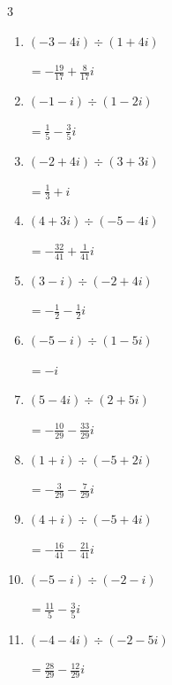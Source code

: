 \begin{multicols}{3}
\begin{enumerate}
        $\displaystyle =-\frac{24}{29}+\frac{2}{29}i$

\columnbreak %

\resetques

  \item $\displaystyle (-3-4i)\div(1+4i)$

        $\displaystyle =-\frac{19}{17}+\frac{8}{17}i$

  \item $\displaystyle (-1-i)\div(1-2i)$

        $\displaystyle =\frac{1}{5}-\frac{3}{5}i$

  \item $\displaystyle (-2+4i)\div(3+3i)$

        $\displaystyle =\frac{1}{3}+i$

  \item $\displaystyle (4+3i)\div(-5-4i)$

        $\displaystyle =-\frac{32}{41}+\frac{1}{41}i$

  \item $\displaystyle (3-i)\div(-2+4i)$

        $\displaystyle =-\frac{1}{2}-\frac{1}{2}i$

  \item $\displaystyle (-5-i)\div(1-5i)$

        $\displaystyle =-i$

  \item $\displaystyle (5-4i)\div(2+5i)$

        $\displaystyle =-\frac{10}{29}-\frac{33}{29}i$

  \item $\displaystyle (1+i)\div(-5+2i)$

        $\displaystyle =-\frac{3}{29}-\frac{7}{29}i$

  \item $\displaystyle (4+i)\div(-5+4i)$

        $\displaystyle =-\frac{16}{41}-\frac{21}{41}i$

  \item $\displaystyle (-5-i)\div(-2-i)$

        $\displaystyle =\frac{11}{5}-\frac{3}{5}i$

\columnbreak %

  \item $\displaystyle (-4-4i)\div(-2-5i)$

        $\displaystyle =\frac{28}{29}-\frac{12}{29}i$


\end{enumerate}
\end{multicols}
